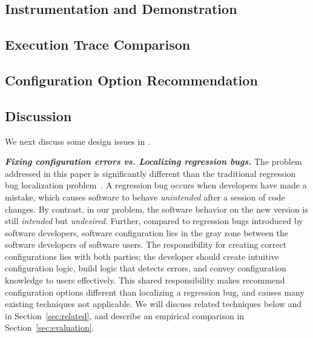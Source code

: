 \subsection{Instrumentation and Demonstration}
\label{sec:profiling}



\subsection{Execution Trace Comparison}
\label{sec:comparison}



\subsection{Configuration Option Recommendation}
\label{sec:rootcause}



\subsection{Discussion}
\label{sec:tech_discuss}

We next discuss some design issues in \ourtool.

\vspace{1mm}

\noindent \textbf{\textit{Fixing configuration errors 
vs. Localizing regression bugs.}}
The problem addressed in this paper is significantly different
than the traditional regression bug localization problem~\cite{dd, autoflow}.
A regression bug occurs when developers have made a mistake,
which causes software to behave \textit{unintended} after a session of code changes.
By contrast, in our problem, the software behavior on the new version
is still \textit{intended} but \textit{undesired}. 
Further, compared to
regression bugs introduced by software developers,
software configuration lies in the gray zone between
the software developers of software users. The responsibility for creating
correct configurations lies with both parties; the developer should create
intuitive configuration logic, build logic that detects
errors, and convey configuration knowledge to users
effectively. This shared responsibility makes recommend configuration options
different than localizing a regression bug, and causes many existing
techniques not applicable. We will discuss related techniques below
and in Section~\ref{sec:related}, and describe an empirical comparison
in Section~\ref{sec:evaluation}.


